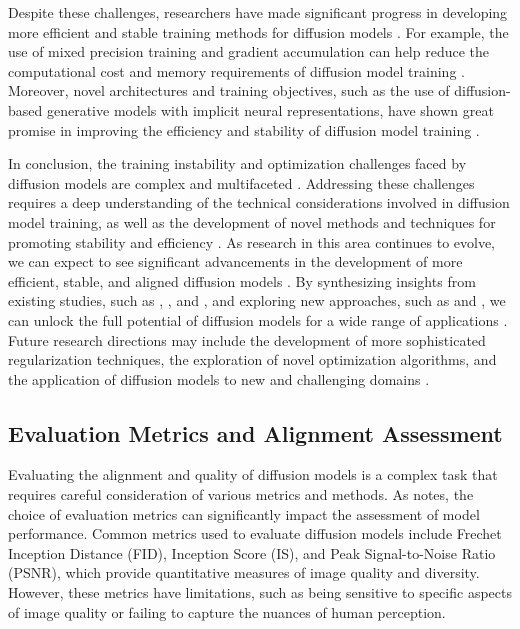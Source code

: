 \documentclass[11pt,a4paper]{article}
\begin{document}
Despite these challenges, researchers have made significant progress in developing more efficient and stable training methods for diffusion models \cite{arxiv:2502.06805}. For example, the use of mixed precision training and gradient accumulation can help reduce the computational cost and memory requirements of diffusion model training \cite{arxiv:2403.02084}. Moreover, novel architectures and training objectives, such as the use of diffusion-based generative models with implicit neural representations, have shown great promise in improving the efficiency and stability of diffusion model training \cite{arxiv:2510.17136}.

In conclusion, the training instability and optimization challenges faced by diffusion models are complex and multifaceted \cite{arxiv:2502.12154}. Addressing these challenges requires a deep understanding of the technical considerations involved in diffusion model training, as well as the development of novel methods and techniques for promoting stability and efficiency \cite{arxiv:2409.15761}. As research in this area continues to evolve, we can expect to see significant advancements in the development of more efficient, stable, and aligned diffusion models \cite{arxiv:2402.02030}. By synthesizing insights from existing studies, such as \cite{doi:10.1145/3626235}, \cite{arxiv:2306.04542}, and \cite{arxiv:2502.06805}, and exploring new approaches, such as \cite{arxiv:2501.18865} and \cite{arxiv:2506.11039}, we can unlock the full potential of diffusion models for a wide range of applications \cite{arxiv:2407.11942}. Future research directions may include the development of more sophisticated regularization techniques, the exploration of novel optimization algorithms, and the application of diffusion models to new and challenging domains \cite{arxiv:2402.16302}.


\subsection{Evaluation Metrics and Alignment Assessment}


Evaluating the alignment and quality of diffusion models is a complex task that requires careful consideration of various metrics and methods. As \cite{doi:10.1145/3626235} notes, the choice of evaluation metrics can significantly impact the assessment of model performance. Common metrics used to evaluate diffusion models include Frechet Inception Distance (FID), Inception Score (IS), and Peak Signal-to-Noise Ratio (PSNR), which provide quantitative measures of image quality and diversity. However, these metrics have limitations, such as being sensitive to specific aspects of image quality or failing to capture the nuances of human perception.
\end{document}

